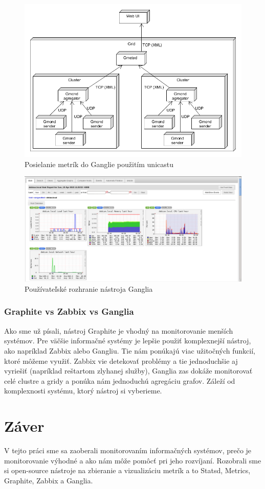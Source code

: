 \documentclass[a4paper, usesections, upjsfrontpage, disablespecwarning, thesismargins, thesislinespacing]{rnthesissvk}
\begin{document}
\begin{figure}
\begin{center}
\includegraphics[scale=0.55]{ganglia-architecture.png}
\end{center}
\caption{Posielanie metrík do Ganglie použitím unicastu}
\end{figure}

\begin{figure}
\begin{center}
\includegraphics[scale=0.41]{ganglia.png}
\end{center}
\caption{Používateľské rozhranie nástroja Ganglia}
\end{figure}

\subsubsection{Graphite vs Zabbix vs Ganglia}

Ako sme už písali, nástroj Graphite je vhodný na monitorovanie menších systémov.
Pre väčšie informačné systémy je lepšie použiť komplexnejší nástroj, ako napríklad Zabbix alebo Gangliu.
Tie nám ponúkajú viac užitočných funkcií, ktoré môžeme využiť.
Zabbix vie detekovať problémy a tie jednoduchšie aj vyriešiť (napríklad reštartom zlyhanej služby), 
	Ganglia zas dokáže monitorovať celé clustre a gridy a ponúka nám jednoduchú agregáciu grafov.
Záleží od komplexnosti systému, ktorý nástroj si vyberieme.


\newpage

\section{Záver}

V tejto práci sme sa zaoberali monitorovaním informačných systémov, prečo je monitorovanie výhodné a ako nám môže pomôcť pri jeho rozvíjaní.
Rozobrali sme si open-source nástroje na zbieranie a vizualizáciu metrík a to Statsd, Metrics, Graphite, Zabbix a Ganglia.
\end{document}
